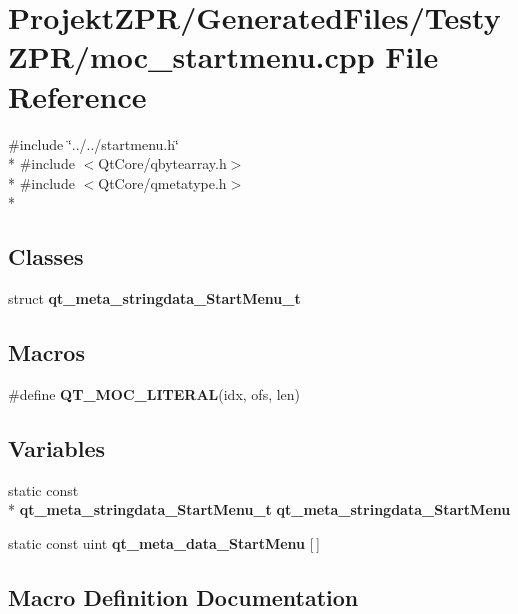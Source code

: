 \section{Projekt\-Z\-P\-R/\-Generated\-Files/\-Testy\-Z\-P\-R/moc\-\_\-startmenu.cpp File Reference}
\label{_testy_z_p_r_2moc__startmenu_8cpp}
{\ttfamily \#include \char`\"{}../../startmenu.\-h\char`\"{}}\\*
{\ttfamily \#include $<$Qt\-Core/qbytearray.\-h$>$}\\*
{\ttfamily \#include $<$Qt\-Core/qmetatype.\-h$>$}\\*
\subsection*{Classes}
\begin{DoxyCompactItemize}
\item 
struct {\bf qt\-\_\-meta\-\_\-stringdata\-\_\-\-Start\-Menu\-\_\-t}
\end{DoxyCompactItemize}
\subsection*{Macros}
\begin{DoxyCompactItemize}
\item 
\#define {\bf Q\-T\-\_\-\-M\-O\-C\-\_\-\-L\-I\-T\-E\-R\-A\-L}(idx, ofs, len)
\end{DoxyCompactItemize}
\subsection*{Variables}
\begin{DoxyCompactItemize}
\item 
static const \\*
{\bf qt\-\_\-meta\-\_\-stringdata\-\_\-\-Start\-Menu\-\_\-t} {\bf qt\-\_\-meta\-\_\-stringdata\-\_\-\-Start\-Menu}
\item 
static const uint {\bf qt\-\_\-meta\-\_\-data\-\_\-\-Start\-Menu} [$\,$]
\end{DoxyCompactItemize}


\subsection{Macro Definition Documentation}
